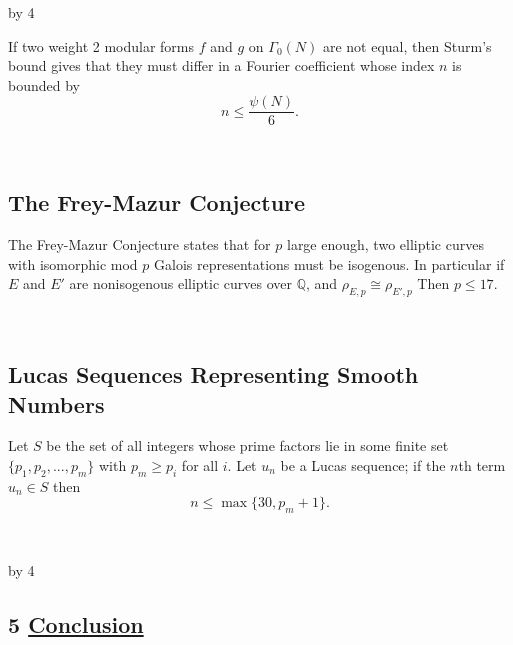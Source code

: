 \documentclass[12pt]{scrartcl}
\def\Q{{\mathbb Q}}
\def\anzspalten{4}
\newlength{\kastenwidth}
\newenvironment{kasten}{%
  \begin{lrbox}{\dummybox}%
    \begin{minipage}{0.96\linewidth}}%
    {\end{minipage}%
  \end{lrbox}%
  \raisebox{-\depth}{\psshadowbox[framesep=1em]{\usebox{\dummybox}}}\\[0.5em]}
\newenvironment{spalte}{%
  \setlength\kastenwidth{1.2\textwidth}
  \divide\kastenwidth by \anzspalten
  \begin{minipage}[t]{\kastenwidth}}{\end{minipage}\hfill}
\begin{document}
\begin{lrbox}{\spalten}
{\begin{spalte}
\begin{kasten}
If two weight 2 modular forms $f$ and $g$ on $\Gamma_0(N)$ are not equal, then Sturm's bound gives that they must differ in a Fourier coefficient whose index $n$ is bounded by 
\[n \leq \frac{\psi(N)}{6}.\] 

\end{kasten}

\begin{kasten}

\subsection*{ \color{blue} The Frey-Mazur Conjecture}

The Frey-Mazur Conjecture states that for $p$ large enough, two elliptic curves with isomorphic mod $p$ Galois representations must be isogenous. In particular if $E$ and $E'$ are nonisogenous elliptic curves over $\Q$, and $\rho_{E,p} \cong \rho_{E',p}$
Then $p\leq 17$.


\end{kasten}

\begin{kasten}

\subsection*{ \color{blue} Lucas Sequences Representing Smooth Numbers}

Let $S$ be the set of all integers whose prime factors lie in some finite set $\{p_1,p_2,...,p_m\}$ with $p_m \geq p_i$ for all $i$.  Let $u_n$ be a Lucas sequence; if the $n$th term $u_n \in S$ then
\[ n \leq \max\{30, p_m +1 \}. \]

\end{kasten}




\end{spalte}
    \begin{spalte}
\vspace{-2.81in}

\begin{kasten}
\section*{5 \hspace{0.1cm} {\color{red} 
\underline{Conclusion}}}
\end{kasten}


\end{spalte}}
\end{lrbox}
\end{document}
